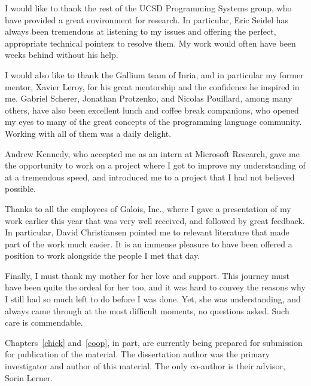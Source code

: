 \documentclass[12pt]{ucsddissertation}
\begin{document}
\begin{acknowledgements}
I would like to thank the rest of the UCSD Programming Systems group, who have
provided a great environment for research.  In particular, Eric Seidel has
always been tremendous at listening to my issues and offering the perfect,
appropriate technical pointers to resolve them.  My work would often have been
weeks behind without his help.

I would also like to thank the Gallium team of Inria, and in particular my
former mentor, Xavier Leroy, for his great mentorship and the confidence he
inspired in me.  Gabriel Scherer, Jonathan Protzenko, and Nicolas Pouillard,
among many others, have also been excellent lunch and coffee break companions,
who opened my eyes to many of the great concepts of the programming language
community.  Working with all of them was a daily delight.

Andrew Kennedy, who accepted me as an intern at Microsoft Research, gave me the
opportunity to work on a project where I got to improve my understanding of
\Coq{} at a tremendous speed, and introduced me to a project that I had not
believed possible.

Thanks to all the employees of Galois, Inc., where I gave a presentation of my
work earlier this year that was very well received, and followed by great
feedback.  In particular, David Christiansen pointed me to relevant literature
that made part of the work much easier.  It is an immense pleasure to have been
offered a position to work alongside the people I met that day.

Finally, I must thank my mother for her love and support.  This journey must
have been quite the ordeal for her too, and it was hard to convey the reasons
why I still had so much left to do before I was done.  Yet, she was
understanding, and always came through at the most difficult moments, no
questions asked.  Such care is commendable.

Chapters~\ref{chick} and~\ref{coop}, in part, are currently being prepared for
submission for publication of the material.  The dissertation author was the
primary investigator and author of this material.  The only co-author is their
advisor, Sorin Lerner.




\end{acknowledgements}
\end{document}
